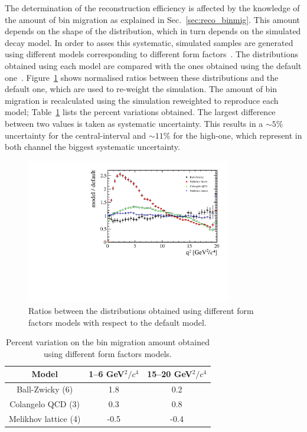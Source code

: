 The determination of the reconstruction efficiency is affected by the knowledge of the
amount of bin migration as explained in Sec.~\ref{sec:reco_binmig}. This amount depends
on the shape of the \qsq distribution, which in turn depends on the simulated \BdToKstee decay model.
In order to asses this systematic, simulated samples are generated using different
models corresponding to different form factors~\cite{Ball:2004ye,Melikhov:2000yu}.
The \qsq distributions obtained using each model are compared with the ones obtained using
the default one~\cite{Ali:1999mm}.
Figure~\ref{fig:q2ratios} shows normalised ratios between these \qsq distributions and the default one, 
which are used to re-weight the simulation. The amount of bin migration is recalculated
using the simulation reweighted to reproduce each model; Table~\ref{tab:sys_binmig} lists the
percent variations obtained. The largest difference between two values is taken as systematic uncertainty.
This results in a $\sim5\%$ uncertainty for the central-\qsq interval and $\sim11\%$ for the high-\qsq one,
which represent in both channel the biggest systematic uncertainty.
%
\begin{figure}[h!]
\centering \includegraphics[width=0.8\textwidth]{RKst/figs/models_ratios.pdf}
\caption{Ratios between the \qsq distributions obtained using different form
factors models with respect to the default model. }
\label{fig:q2ratios}
\end{figure}
%
\begin{table}[h!]
\centering
\caption{Percent variation on the bin migration amount obtained using different form factors models.}
\begin{tabular}{|c|c|c|}
\hline
Model                   & 1--6 GeV$^2/c^4$  &  15--20 GeV$^2/c^4$ \\ \hline
Ball-Zwicky (6)         & 1.8          & 0.2    \\
Colangelo QCD (3)   & 0.3           & 0.8    \\
Melikhov lattice  (4)   & -0.5          & -0.4    \\
\hline 
\end{tabular}
\label{tab:sys_binmig}
\end{table}




